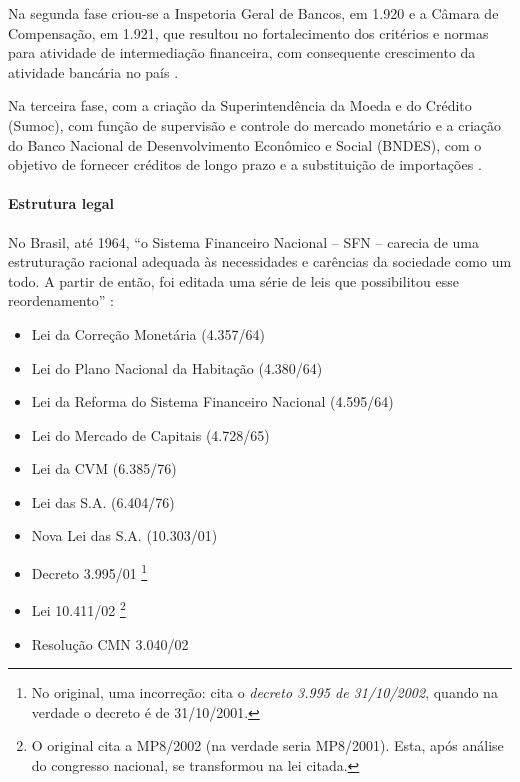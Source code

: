 \documentclass[]{article}
\providecommand{\tightlist}{%
  \setlength{\itemsep}{0pt}\setlength{\parskip}{0pt}}
\let\oldparagraph\paragraph
\renewcommand{\paragraph}[1]{\oldparagraph{#1}\mbox{}}
\let\rmarkdownfootnote\footnote%
\def\footnote{\protect\rmarkdownfootnote}
\begin{document}
Na segunda fase criou-se a Inspetoria Geral de Bancos, em 1.920 e a
Câmara de Compensação, em 1.921, que resultou no fortalecimento dos
critérios e normas para atividade de intermediação financeira, com
consequente crescimento da atividade bancária no país
\cite[p.~12]{beatrizselan}.

Na terceira fase, com a criação da Superintendência da Moeda e do
Crédito (Sumoc), com função de supervisão e controle do mercado
monetário e a criação do Banco Nacional de Desenvolvimento Econômico e
Social (BNDES), com o objetivo de fornecer créditos de longo prazo e a
substituição de importações \cite[p.~12]{beatrizselan}.

\paragraph{Estrutura legal}\label{estrutura-legal}

No Brasil, até 1964, ``o Sistema Financeiro Nacional -- SFN -- carecia
de uma estruturação racional adequada às necessidades e carências da
sociedade como um todo. A partir de então, foi editada uma série de leis
que possibilitou esse reordenamento'' \cite[p.~15-16]{fortuna2015}:

\begin{itemize}
\tightlist
\item
  Lei da Correção Monetária (4.357/64) \cite{brasil1964a}
\item
  Lei do Plano Nacional da Habitação (4.380/64) \cite{brasil1964b}
\item
  Lei da Reforma do Sistema Financeiro Nacional (4.595/64)
  \cite{brasil1964c}
\item
  Lei do Mercado de Capitais (4.728/65) \cite{brasil1965}
\item
  Lei da CVM (6.385/76) \cite{brasil1976a}
\item
  Lei das S.A. (6.404/76) \cite{brasil1976b}
\item
  Nova Lei das S.A. (10.303/01) \cite{brasil2001a}
\item
  Decreto 3.995/01 \cite{brasil2001b}\footnote{No original, uma
    incorreção:  cita o \emph{decreto
    3.995 de 31/10/2002}, quando na verdade o decreto é de 31/10/2001.}
\item
  Lei 10.411/02 \cite{brasil2002}\footnote{O original cita a MP8/2002
    (na verdade seria MP8/2001). Esta, após análise do congresso
    nacional, se transformou na lei citada.}
\item
  Resolução CMN 3.040/02 \cite{bcb2002}
\end{itemize}
\end{document}
